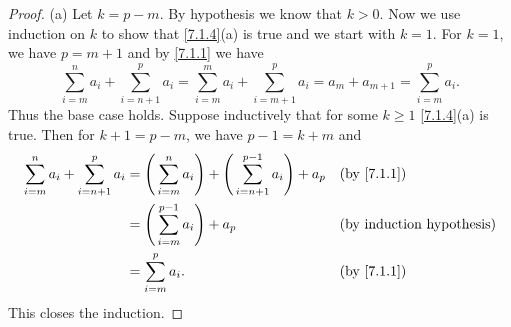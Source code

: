 \begin{proof}{(a)}
  Let \(k = p - m\).
  By hypothesis we know that \(k > 0\).
  Now we use induction on \(k\) to show that \cref{7.1.4}(a) is true and we start with \(k = 1\).
  For \(k = 1\), we have \(p = m + 1\) and by \cref{7.1.1} we have
  \[
    \sum_{i = m}^n a_i + \sum_{i = n + 1}^p a_i = \sum_{i = m}^m a_i + \sum_{i = m + 1}^p a_i = a_m + a_{m + 1} = \sum_{i = m}^p a_i.
  \]
  Thus the base case holds.
  Suppose inductively that for some \(k \geq 1\) \cref{7.1.4}(a) is true.
  Then for \(k + 1 = p - m\), we have \(p - 1 = k + m\) and
  \begin{align*}
    \sum_{i = m}^n a_i + \sum_{i = n + 1}^p a_i & = \Bigg(\sum_{i = m}^n a_i\Bigg) + \Bigg(\sum_{i = n + 1}^{p - 1} a_i\Bigg) + a_p &  & \text{(by \cref{7.1.1})}         \\
                                                & = \Bigg(\sum_{i = m}^{p - 1} a_i\Bigg) + a_p                                      &  & \text{(by induction hypothesis)} \\
                                                & = \sum_{i = m}^p a_i.                                                             &  & \text{(by \cref{7.1.1})}
  \end{align*}
  This closes the induction.
\end{proof}

